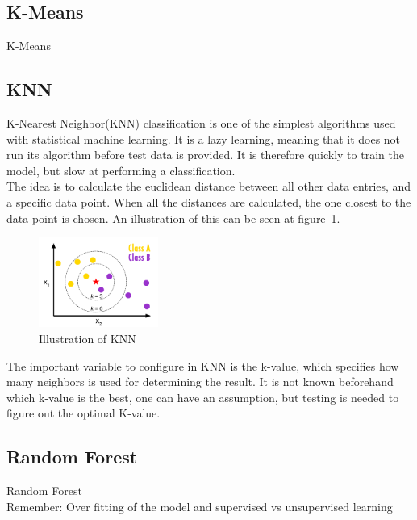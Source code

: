 \documentclass[report]{subfiles}
\begin{document}
\subsection{K-Means}
\label{sec:theorykMeans}
K-Means

\subsection{KNN}
\label{sec:theoryKNN}
K-Nearest Neighbor(KNN) classification is one of the simplest algorithms used with statistical machine learning. It is a lazy learning, meaning that it does not run its algorithm before test data is provided. It is therefore quickly to train the model, but slow at performing a classification.\\
The idea is to calculate the euclidean distance between all other data entries, and a specific data point. When all the distances are calculated, the one closest to the data point is chosen. An illustration of this can be seen at figure~\ref{fig:knnExp}.

\begin{figure}[H]
	\centering
	\includegraphics[width=0.35\textwidth]{images/knnExp}
	\caption{Illustration of KNN}
	\label{fig:knnExp}
\end{figure}

The important variable to configure in KNN is the k-value, which specifies how many neighbors is used for determining the result. It is not known beforehand which k-value is the best, one can have an assumption, but testing is needed to figure out the optimal K-value.

\subsection{Random Forest}
\label{sec:theoryRandomForest}
Random Forest\\
Remember: Over fitting of the model and supervised vs unsupervised learning
\end{document}
